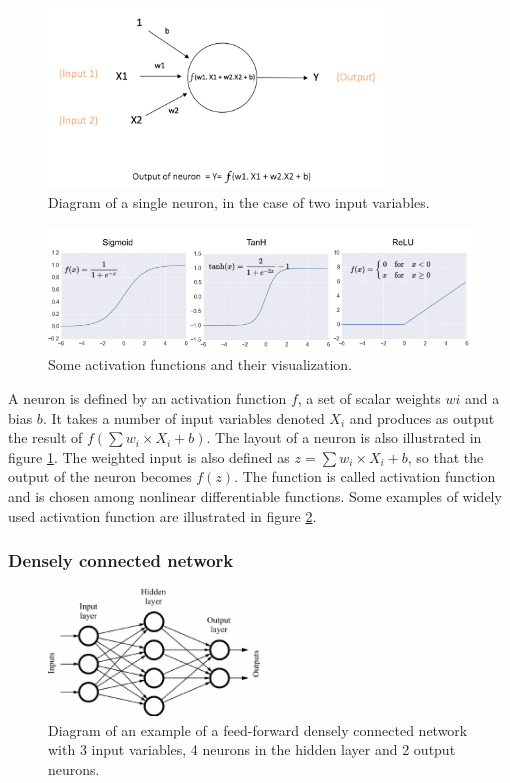 \begin{figure}
    \centering
    \includegraphics[width=0.8\textwidth]{Images/neuron_diagram}
    \caption{Diagram of a single neuron, in the case of two input variables.}
    \label{fig:neuron_diagram}
\end{figure}


\begin{figure}
    \centering
    \includegraphics[width=\textwidth]{Images/activation_functions.png}
    \caption{Some activation functions and their visualization.}
    \label{fig:activation_functions}
\end{figure}

A neuron is defined by an activation function $f$, a set of scalar weights $wi$ and a bias $b$. It takes a number of input variables denoted $X_i$ and produces as output the result of $f(\sum w_i\times X_i + b)$. The layout of a neuron is also illustrated in figure \ref{fig:neuron_diagram}. The weighted input is also defined as $z = \sum w_i\times X_i + b$, so that the output of the neuron becomes $f(z)$. The function is called activation function and is chosen among nonlinear differentiable functions. Some examples of widely used activation function are illustrated in figure \ref{fig:activation_functions}. 

\subsubsection{Densely connected network}


\begin{figure}
    \centering
    \includegraphics[width=0.5\textwidth]{Images/dense_network.png}
    \caption{Diagram of an example of a feed-forward densely connected network with 3 input variables, 4 neurons in the hidden layer and 2 output neurons.}
    \label{fig:dense_network}
\end{figure}

